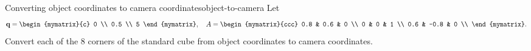 \begin{example}{Converting object coordinates to camera coordinates}{object-to-camera}
  Let
  \begin{equation*}
    \vect{q} = \begin{mymatrix}{c} 0 \\ 0.5 \\ 5 \end{mymatrix},\quad
    A = \begin{mymatrix}{ccc}
      0.8 & 0.6 & 0 \\
      0 & 0 & 1 \\
      0.6 & -0.8 & 0 \\
    \end{mymatrix}.
  \end{equation*}
  Convert each of the 8 corners of the standard cube from object
  coordinates to camera coordinates.
\end{example}

